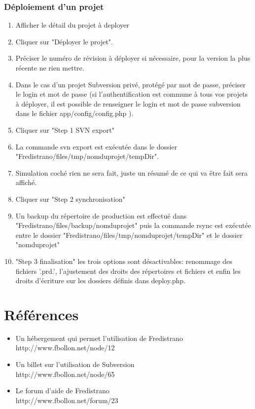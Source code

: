 \documentclass[12pt,a4paper]{report}
\begin{document}
\subsection{Déploiement d'un projet}
\begin{enumerate}
\item Afficher le détail du projet à deployer
\item Cliquer sur "Déployer le projet".
\item Préciser le numéro de révision à déployer si nécessaire, pour la version la plus récente ne rien mettre.
\item Dans le cas d'un projet Subversion privé, protégé par mot de passe, préciser le login et mot de passe (si l'authentification est commune à tous vos projets à déployer, il est possible de renseigner le login et mot de passe subversion dans le fichier app/config/config.php ).
\item Cliquer sur "Step 1 SVN export"
\item La commande svn export est exécutée dans le dossier "Fredistrano/files/tmp/nomduprojet/tempDir".
\item Simulation coché rien ne sera fait, juste un résumé de ce qui va être fait sera affiché.
\item Cliquer sur "Step 2 synchronisation"
\item Un backup du répertoire de production est effectué dans "Fredistrano/files/backup/nomduprojet" puis la commande rsync est exécutée entre le dossier "Fredistrano/files/tmp/nomduprojet/tempDir" et le dossier "nomduprojet"
\item "Step 3 finalisation" les trois options sont désactivables: renommage des fichiers '.prd.', l'ajustement des droits des répertoires et fichiers et enfin les droits d'écriture sur les dossiers définis dans deploy.php.
\end{enumerate}

\chapter{Références}
\begin{itemize}
\item Un hébergement qui permet l'utilisation de Fredistrano \\ http://www.fbollon.net/node/12 \\
\item Un billet sur l'utilisation de Subversion \\ http://www.fbollon.net/node/65 \\
\item Le forum d'aide de Fredistrano \\ http://www.fbollon.net/forum/23
\end{itemize}
\end{document}
